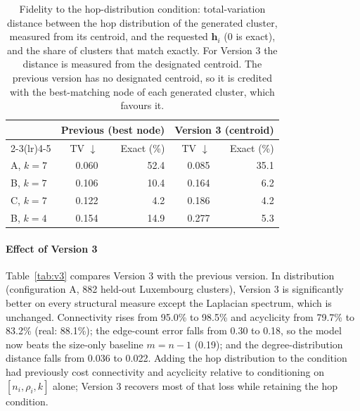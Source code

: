 
\begin{table}[t]
\centering
\caption{Fidelity to the hop-distribution condition: total-variation distance
between the hop distribution of the generated cluster, measured from its
centroid, and the requested $\mathbf{h}_i$ (0 is exact), and the share of
clusters that match exactly. For Version 3 the distance is measured from the
designated centroid. The previous version has no designated centroid, so it is
credited with the best-matching node of each generated cluster, which favours
it.}
\label{tab:v3-hop}
\begin{tabular}{lrrrr}
\toprule
& \multicolumn{2}{c}{Previous (best node)} & \multicolumn{2}{c}{Version 3 (centroid)} \\
\cmidrule(lr){2-3}\cmidrule(lr){4-5}
& TV $\downarrow$ & Exact (\%) & TV $\downarrow$ & Exact (\%) \\
\midrule
A, $k = 7$ & 0.060 & 52.4 & 0.085 & 35.1 \\
B, $k = 7$ & 0.106 & 10.4 & 0.164 &  6.2 \\
C, $k = 7$ & 0.122 &  4.2 & 0.186 &  4.2 \\
B, $k = 4$ & 0.154 & 14.9 & 0.277 &  5.3 \\
\bottomrule
\end{tabular}
\end{table}



\paragraph{Effect of Version 3}
Table~\ref{tab:v3} compares Version 3 with the previous version. In
distribution (configuration A, 882 held-out Luxembourg clusters), Version 3 is
significantly better on every structural measure except the Laplacian spectrum,
which is unchanged. Connectivity rises from 95.0\% to 98.5\% and acyclicity
from 79.7\% to 83.2\% (real: 88.1\%); the edge-count error falls from 0.30 to
0.18, so the model now beats the size-only baseline $m = n - 1$ (0.19); and the
degree-distribution distance falls from 0.036 to 0.022. Adding the hop
distribution to the condition had previously cost connectivity and acyclicity
relative to conditioning on $[n_i, \rho_i, k]$ alone; Version 3 recovers most
of that loss while retaining the hop condition.

